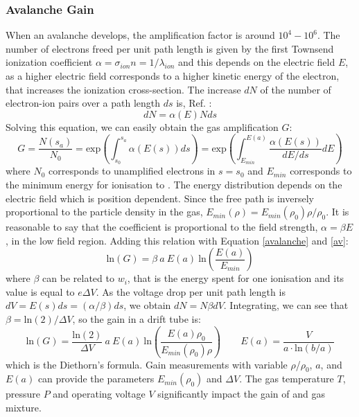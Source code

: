 \subsubsection{Avalanche Gain}
When an avalanche develops, the amplification factor is around $10^4-10^6$. The number of electrons freed per unit path length is given
by the first Townsend ionization coefficient $\alpha=\sigma_{ion}n=1/\lambda_{ion}$ and this depends on the electric field $E$, 
as a higher electric field corresponds to a higher kinetic energy of the electron, that increases the ionization cross-section.
The increase $dN$ of the number of electron-ion pairs over a path length $ds$ is, Ref. \cite{kola}:
\begin{equation}
    dN=\alpha(E)Nds
\end{equation}
Solving this equation, we can easily obtain the gas amplification $G$:
\begin{equation}\label{av}
    G=\frac{N(s_a)}{N_0}=\text{exp} \left( \int_{s_0}^{s_a} \alpha(E(s)) ds \right)=\text{exp} \left( \int_{E_{min}}^{E(a)} \frac{\alpha(E(s))}{dE/ds} dE \right)
\end{equation}
where $N_0$ corresponds to unamplified electrons in $s=s_0$ and $E_{min}$ corresponds to the minimum energy 
for ionisation to . The energy distribution depends on the electric field which is position dependent. 
Since the free path is inversely proportional to the particle density in the gas, $E_{min}(\rho)=E_{min}(\rho_0)\rho/\rho_0$.
It is reasonable to say that the coefficient is proportional to the field strength, $\alpha= \beta E$, in the low field region. 
Adding this relation with Equation \ref{avalanche} and \ref{av}:
\begin{equation}
     \text{ln}(G)=\beta \ a \ E(a) \ \text{ln}\left( \frac{E(a)}{E_{min}}\right)
\end{equation}
where $\beta$ can be related to $w_i$, that is the energy spent for one ionisation and its value is equal to $e \Delta V$.
As the voltage drop per unit path length is $dV = E(s)ds = (\alpha/\beta)ds$, we obtain $dN=N \beta dV$. Integrating, we can see that
$\beta= \text{ln}(2)/\Delta V$, so the gain in a drift tube is:
\begin{equation}\label{XXX}
     \text{ln}(G)=\frac{ \text{ln}(2)}{\Delta V} \ a \ E(a)  \ \text{ln}\left( \frac{E(a)\rho_0}{E_{min}(\rho_0)\rho}\right) \qquad E(a)=\frac{V}{a \cdot \text{ln}(b/a)}
\end{equation}
which is the Diethorn's formula. 
Gain measurements with variable $\rho$/$\rho_0$, $a$, and $E(a)$ can provide the parameters $E_{min} (\rho_0)$ and $\Delta V$. 
The gas temperature $T$, pressure $P$ and operating voltage $V$ significantly impact
the gain of 
%
and gas mixture. 
